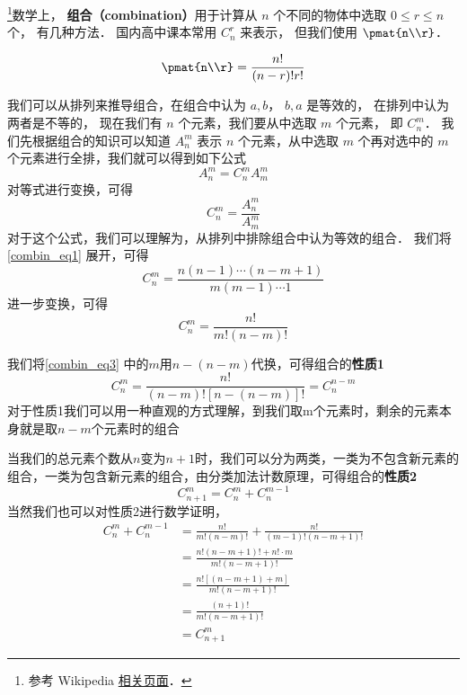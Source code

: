 
\begin{issues}
\issueDraft
\end{issues}


\footnote{参考 Wikipedia \href{https://en.wikipedia.org/wiki/Combination}{相关页面}．}数学上， \textbf{组合（combination）}用于计算从 $n$ 个不同的物体中选取 $0 \leqslant r \leqslant n$ 个， 有几种方法． 国内高中课本常用 $C_n^r$ 来表示， 但我们使用 $\pmat{n\\r}$．

\begin{equation}
\pmat{n\\r} = \frac{n!}{(n-r)!r!}
\end{equation}

我们可以从排列来推导组合，在组合中认为 ${a,b}$， ${b,a}$ 是等效的， 在排列中认为两者是不等的， 现在我们有 $n$ 个元素，我们要从中选取 $m$ 个元素， 即 $C_n^m$．
我们先根据组合的知识可以知道 $A_n^m$ 表示 $n$ 个元素，从中选取 $m$ 个再对选中的 $m$ 个元素进行全排，我们就可以得到如下公式
\begin{equation}
A_n^m = C_n^m A_m^m
\end{equation}
对等式进行变换，可得
\begin{equation}\label{combin_eq1}
C_n^m = \frac{A_n^m}{A_m^m}
\end{equation}
对于这个公式，我们可以理解为，从排列中排除组合中认为等效的组合．
我们将\autoref{combin_eq1} 展开，可得
\begin{equation}\label{combin_eq2}
C_n^m = \frac{n(n - 1) \cdots (n - m + 1)}{m(m-1)\cdots 1}
\end{equation}
进一步变换，可得
\begin{equation}\label{combin_eq3}
C_n^m = \frac{n!}{m!(n-m)!}
\end{equation}

我们将\autoref{combin_eq3} 中的$m$用$n-(n-m)$代换，可得组合的\textbf{性质1}
\begin{equation}
C_n^m = \frac{n!}{(n-m)![n-(n-m)]!} = C_n^{n-m}
\end{equation}
对于性质1我们可以用一种直观的方式理解，到我们取m个元素时，剩余的元素本身就是取$n-m$个元素时的组合

当我们的总元素个数从$n$变为$n+1$时，我们可以分为两类，一类为不包含新元素的组合，一类为包含新元素的组合，由分类加法计数原理，可得组合的\textbf{性质2}
\begin{equation}
C_{n + 1}^m = C_n^m + C_n^{m - 1}
\end{equation}
当然我们也可以对性质2进行数学证明，
\begin{equation}
\begin{aligned}
C_n^m + C_n^{m - 1} &= \frac{n!}{m!(n-m)!} + \frac{n!}{(m - 1)!(n - m + 1)!}\\
&=\frac{n!(n - m + 1)! + n!\cdot m}{m!(n - m + 1)!}\\
&=\frac{n![(n - m + 1) + m]}{m!(n - m + 1)!}\\
&=\frac{(n + 1)!}{m!(n - m + 1)!}\\
&=C_{n+1}^m
\end{aligned}
\end{equation}